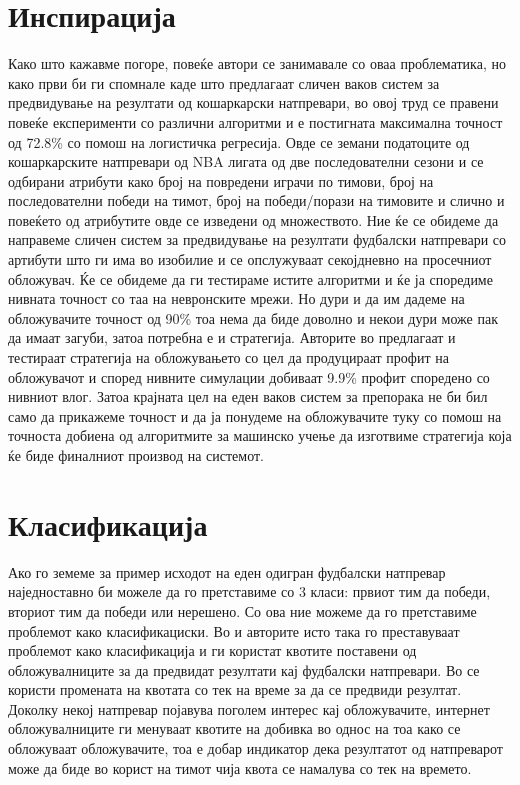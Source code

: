 \section{Инспирација}
Како што кажавме погоре, повеќе автори се занимавале со оваа проблематика, но како први би ги спомнале \cite{zdravevski2010system} каде што предлагаат сличен ваков систем за предвидување на резултати од кошаркарски натпревари, во овој труд се правени повеќе експерименти со различни алгоритми и е постигната максимална точност од 72.8\% со помош на логистичка регресија. Овде се земани податоците од кошаркарските натпревари од NBA лигата од две последователни сезони и се одбирани атрибути како број на повредени играчи по тимови, број на последователни победи на тимот, број на победи/порази на тимовите и слично и повеќето од атрибутите овде се изведени од множеството. Ние ќе се обидеме да направеме сличен систем за предвидување на резултати фудбалски натпревари со артибути што ги има во изобилие и се опслужуваат секојдневно на просечниот обложувач. Ќе се обидеме да ги тестираме истите алгоритми и ќе ја споредиме нивната точност со таа на невронските мрежи. Но дури и да им дадеме на обложувачите точност од 90\% тоа нема да биде доволно и некои дури може пак да имаат загуби, затоа потребна е и стратегија. Авторите во \cite{kaunitz2017beating} предлагаат и тестираат стратегија на обложувањето со цел да продуцираат профит на обложувачот и според нивните симулации добиваат 9.9\% профит споредено со нивниот влог. Затоа крајната цел на еден ваков систем за препорака не би бил само да прикажеме точност и да ја понудеме на обложувачите туку со помош на точноста добиена од алгоритмите за машинско учење да изготвиме стратегија која ќе биде финалниот производ на системот.
\section{Класификација}
Ако го земеме за пример исходот на еден одигран фудбалски натпревар наједноставно би можеле да го претставиме со 3 класи: првиот тим да победи, вториот тим да победи или нерешено. Со ова ние можеме да го претставиме проблемот како класификациски.
Во \cite{odachowski2012using} и \cite{odachowski2012predicting} авторите исто така го преставуваат проблемот како класификација и ги користат квотите поставени од обложувалниците за да предвидат резултати кај фудбалски натпревари. Во \cite{odachowski2012predicting} се користи промената на квотата со тек на време за да се предвиди резултат. Доколку некој натпревар појавува поголем интерес кај обложувачите, интернет обложувалниците ги менуваат квотите на добивка во однос на тоа како се обложуваат обложувачите, тоа е добар индикатор дека резултатот од натпреварот може да биде во корист на тимот чија квота се намалува со тек на времето.

